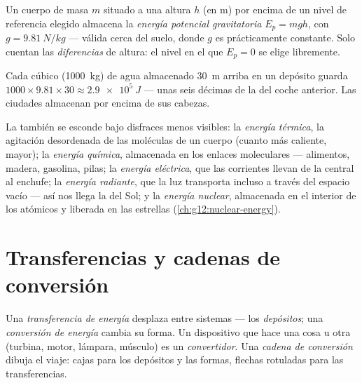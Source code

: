 \begin{definition}\label{def:g10:energy-conservation:potential}
Un cuerpo de masa $m$ situado a una altura $h$ (en \unit{m}) por encima
de un nivel de referencia elegido almacena la \emph{energía potencial
gravitatoria} $E_p = m g h$, con
$g = \qty{9.81}{N/kg}$ --- válida cerca del suelo, donde $g$ es
prácticamente constante. Solo cuentan las \emph{diferencias} de altura:
el nivel en el que $E_p = 0$ se elige libremente.
\end{definition}

\begin{example}\label{ex:g10:energy-conservation:potential}
Cada  cúbico (\qty{1000}{kg}) de agua almacenado \qty{30}{m} arriba
en un depósito guarda
$1000 \times 9.81 \times 30 \approx \qty{2.9e5}{J}$ --- unas seis
décimas de la  del coche anterior. Las ciudades
almacenan  por encima de sus cabezas.
\end{example}

\begin{definition}\label{def:g10:energy-conservation:forms}
La  también se esconde bajo disfraces menos visibles: la
\emph{energía térmica}, la agitación desordenada
de las moléculas de un cuerpo (cuanto más caliente, mayor); la
\emph{energía química}, almacenada en los enlaces
moleculares --- alimentos, madera, gasolina, pilas; la \emph{energía
eléctrica}, que las corrientes llevan de la
central al enchufe; la \emph{energía radiante},
que la luz transporta incluso a través del espacio vacío --- así nos
llega la  del Sol; y la \emph{energía
nuclear}, almacenada en el interior de los
 atómicos y liberada en las estrellas
(\cref{ch:g12:nuclear-energy}).
\end{definition}

\section{Transferencias y cadenas de conversión}

\begin{definition}\label{def:g10:energy-conservation:transfer}
Una \emph{transferencia de energía}
desplaza  entre sistemas --- los
\emph{depósitos}; una \emph{conversión de
energía} cambia su forma. Un dispositivo
que hace una cosa u otra (turbina, motor, lámpara, músculo) es un
\emph{convertidor}. Una \emph{cadena de
conversión} dibuja el viaje: cajas para los
depósitos y las formas, flechas rotuladas para las transferencias.
\end{definition}


